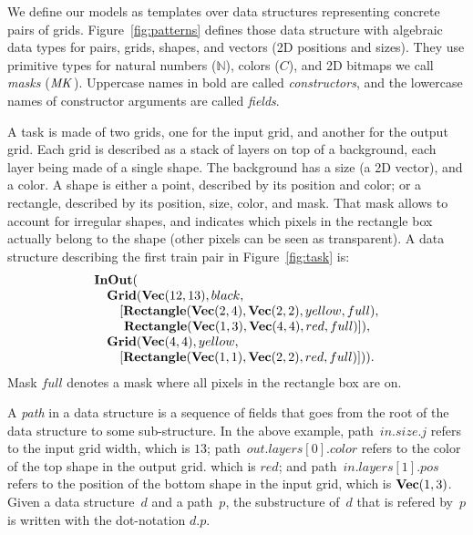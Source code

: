 \documentclass[a4paper]{llncs}
\newcommand{\KILL}[1]{}
\newcommand{\nat}{\mathbb{N}}
\begin{document}
\KILL{Given a shape, parsing a grid consists in finding its instances in the
grid, if any, and to return corresponding values for its variable
attributes. In contrast, generating a grid requires values for the
variable attributes as input in order to generate a shape instance in
the grid.}

We define our models as templates over data structures representing
concrete pairs of grids. Figure~\ref{fig:patterns} defines those data
structure with algebraic data types for pairs, grids, shapes, and
vectors (2D positions and sizes). They use primitive types for natural
numbers ($\nat$), colors ($C$), and 2D bitmaps we call {\em masks}
(${\it MK}$). Uppercase names in bold are called {\em constructors}, and the
lowercase names of constructor arguments are called {\em fields}.

A task is made of two grids, one for the input grid, and another for
the output grid.
%
Each grid is described as a stack of layers on top of a background,
each layer being made of a single shape. The background has a size (a
2D vector), and a color.
%
A shape is either a point, described by its position and color; or a
rectangle, described by its position, size, color, and mask. That mask
allows to account for irregular shapes, and indicates which pixels in
the rectangle box actually belong to the shape (other pixels can be
seen as transparent).
%
A data structure describing the first train pair in Figure~\ref{fig:task}
is:
\[\begin{array}{l}
    {\bf InOut}( \\
    \quad {\bf Grid}({\bf Vec}(12,13), black,\\
    \quad \quad [{\bf Rectangle}({\bf Vec}(2,4), {\bf Vec}(2,2), yellow, full),\\
    \quad \quad ~{\bf Rectangle}({\bf Vec}(1,3), {\bf Vec}(4,4), red, full)]), \\
    \quad {\bf Grid}({\bf Vec}(4,4), yellow, \\
    \quad \quad [{\bf Rectangle}({\bf Vec}(1,1), {\bf Vec}(2,2), red, full)])).
  \end{array} \]
Mask $full$ denotes a mask where all pixels in the rectangle box are on.

A {\em path} in a data structure is a sequence of fields that goes
from the root of the data structure to some sub-structure. In the
above example, path~$in.size.j$ refers to the input grid width, which
is $13$; path~$out.layers[0].color$ refers to the color of the top
shape in the output grid. which is $red$; and path~$in.layers[1].pos$
refers to the position of the bottom shape in the input grid, which is
${\bf Vec}(1,3)$. Given a data structure~$d$ and a path~$p$, the
substructure of~$d$ that is refered by~$p$ is written with the
dot-notation $d.p$.
\end{document}
